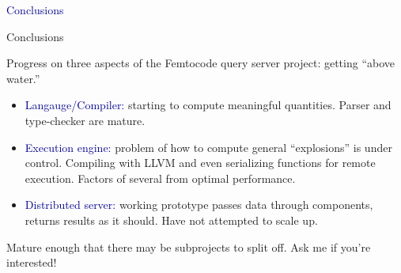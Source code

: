 \documentclass{beamer}
\begin{document}
\begin{frame}{}
\begin{center}
\LARGE \textcolor{darkblue}{Conclusions}
\end{center}
\end{frame}

\begin{frame}{Conclusions}

Progress on three aspects of the Femtocode query server project: getting ``above water.''

\begin{itemize}
\item \textcolor{darkblue}{Langauge/Compiler:} starting to compute meaningful quantities. Parser and type-checker are mature.
\item \textcolor{darkblue}{Execution engine:} problem of how to compute general ``explosions'' is under control. Compiling with LLVM and even serializing functions for remote execution. Factors of several from optimal performance.
\item \textcolor{darkblue}{Distributed server:} working prototype passes data through components, returns results as it should. Have not attempted to scale up.
\end{itemize}

Mature enough that there may be subprojects to split off. Ask me if you're interested!
\end{frame}
\end{document}
